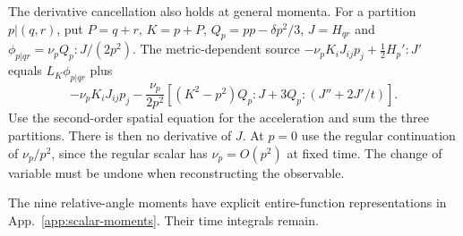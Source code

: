 The derivative cancellation also holds at general momenta. For a partition $p|(q,r)$,
put $P=q+r$, $K=p+P$, $Q_p=pp-\delta p^2/3$, $J=H_{qr}$ and
$\phi_{p|qr}=\nu_p Q_p:J/(2p^2)$. The metric-dependent source
$-\nu_pK_iJ_{ij}p_j+\tfrac12H_p':J'$ equals $L_K\phi_{p|qr}$ plus
\[
 -\nu_pK_iJ_{ij}p_j-\frac{\nu_p}{2p^2}
 [(K^2-p^2)Q_p:J+3Q_p:(J''+2J'/t)].
\]
Use the second-order spatial equation for the acceleration and sum the three partitions.
There is then no derivative of $J$. At $p=0$ use the regular continuation of
$\nu_p/p^2$, since the regular scalar has $\nu_p=O(p^2)$ at fixed time.
The change of variable must be undone when reconstructing the observable.



The nine relative-angle moments have explicit entire-function representations
in App.~\ref{app:scalar-moments}. Their time integrals remain.
